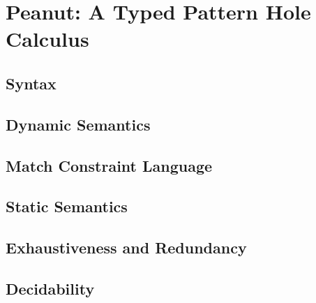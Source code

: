 \section{Peanut: A Typed Pattern Hole Calculus}




\subsection{Syntax}

\subsection{Dynamic Semantics}









\subsection{Match Constraint Language}





\subsection{Static Semantics}




\subsection{Exhaustiveness and Redundancy}



\subsection{Decidability}

